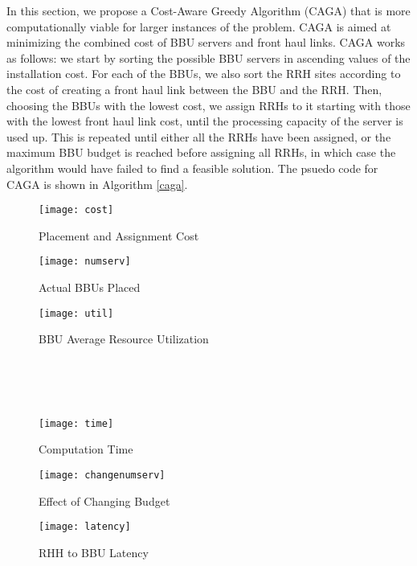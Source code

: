 \documentclass[conference]{IEEEtran}
\begin{document}
In this section, we propose a Cost-Aware Greedy Algorithm (CAGA) that is more computationally viable for larger instances of the problem. CAGA is aimed at minimizing the combined cost of BBU servers and front haul links. CAGA works as follows: we start by sorting the possible BBU servers in ascending values of the installation cost. For each of the BBUs, we also sort the RRH sites according to the cost of creating a front haul link between the BBU and the RRH. Then, choosing the BBUs with the lowest cost, we assign RRHs to it starting with those with the lowest front haul link cost, until the processing capacity of the server is used up. This is repeated until either all the RRHs have been assigned, or the maximum BBU budget  is reached before assigning all RRHs, in which case the algorithm would have failed to find a feasible solution. The psuedo code for CAGA is shown in Algorithm \ref{caga}.\\

\begin{figure*}[ht!]
\setlength{\abovecaptionskip}{7pt plus 0pt minus 0pt}
\setlength{\belowcaptionskip}{7pt plus 0pt minus 0pt}
\begin{minipage}{.33\textwidth}
\centering
\resizebox{.99\textwidth}{!}
{\texttt{[image: cost]}}
  \caption{Placement and Assignment Cost}
  \label{cost}
\end{minipage}
\begin{minipage}{.33\textwidth}
\centering
\resizebox{0.99\textwidth}{!}
{\texttt{[image: numserv]}}
  \caption{Actual BBUs Placed}
  \label{numserv}
\end{minipage}
\begin{minipage}{.33\textwidth}
\centering
\resizebox{0.99\textwidth}{!}
{\texttt{[image: util]}}
  \caption{BBU Average Resource Utilization}
  \label{util}
\end{minipage}\\\\\\

\begin{minipage}{.33\textwidth}
\centering
\resizebox{.99\textwidth}{!}
{\texttt{[image: time]}}
  \caption{Computation Time}
  \label{time}
\end{minipage}
\begin{minipage}{.33\textwidth}
\resizebox{.99\textwidth}{!}
{\texttt{[image: changenumserv]}}
  \caption{Effect of Changing Budget}
  \label{changenumserv}
\end{minipage}
\begin{minipage}{.33\textwidth}
\resizebox{.99\textwidth}{!}
{\texttt{[image: latency]}}
  \caption{RHH to BBU Latency}
  \label{latency}
\end{minipage}
\end{figure*}
\end{document}
